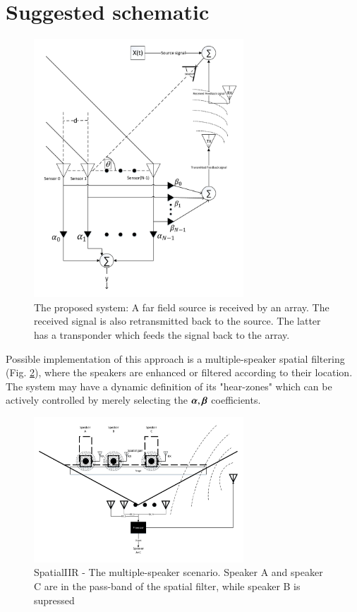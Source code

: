 \documentclass[a4paper,12pt,oneside]{report}
\begin{document}
\section*{Suggested schematic}
\begin{figure}[!ht]
\begin{center}
\includegraphics[width=0.7\textwidth]{./Media/SpatialIIR-diagram/SpatialIIR_VER4.pdf}
\caption
{
The proposed system: A far field source is received by an array. 
The received signal is also retransmitted back to the source. 
The latter has a transponder which feeds the signal back to the array.
}
\label{fig:SignalModel}
\end{center}
\end{figure}

Possible implementation of this approach is a multiple-speaker spatial filtering (Fig. \ref{fig:SpatialIIR_StageApplication}), where the speakers are enhanced or filtered according to their location. 
The system may have a dynamic definition of its "hear-zones" which can be actively controlled by merely selecting the $ \boldsymbol{\alpha},\boldsymbol{\beta} $ coefficients.
\begin{figure}[!ht]
\begin{center}
\includegraphics[width=0.7\textwidth]{./Media/SpatialIIR_Applications/SpatialII_StageApplication_VER3.pdf}
\caption
{
SpatialIIR - The multiple-speaker scenario. 
Speaker A and speaker C are in the pass-band of the spatial filter, while speaker B is supressed
}
\label{fig:SpatialIIR_StageApplication}
\end{center}
\end{figure}
\end{document}
